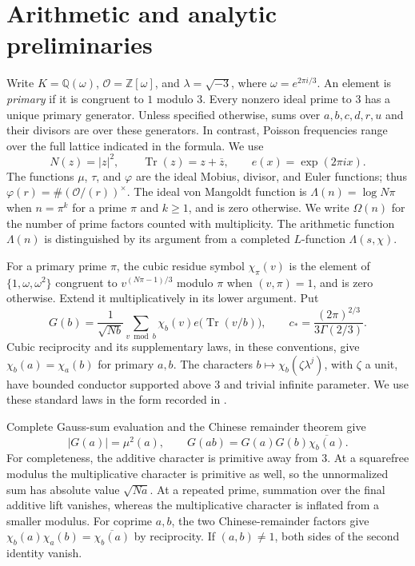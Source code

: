 \section{Arithmetic and analytic preliminaries}
\label{sec:background}
\label{sec:preliminaries}

Write $K=\mathbb Q(\omega)$, $\mathcal O=\mathbb Z[\omega]$, and
$\lambda=\sqrt{-3}$, where $\omega=e^{2\pi i/3}$.
An element is \emph{primary} if it is congruent to $1$ modulo $3$.
Every nonzero ideal prime to $3$ has a unique primary generator.
Unless specified otherwise, sums over $a,b,c,d,r,u$ and their divisors
are over these generators. In contrast, Poisson frequencies range over
the full lattice indicated in the formula. We use
\[
 N(z)=|z|^2,\qquad \operatorname{Tr}(z)=z+\overline z,
 \qquad e(x)=\exp(2\pi i x).
\]
The functions $\mu$, $\tau$, and $\varphi$ are the ideal Mobius, divisor,
and Euler functions; thus $\varphi(r)=\#(\mathcal O/(r))^\times$.
The ideal von Mangoldt function is $\Lambda(n)=\log N\pi$ when
$n=\pi^k$ for a prime $\pi$ and $k\ge1$, and is zero otherwise.
We write $\Omega(n)$ for the number of prime factors counted with
multiplicity. The arithmetic function $\Lambda(n)$ is distinguished
by its argument from a completed $L$-function $\Lambda(s,\chi)$.


For a primary prime $\pi$, the cubic residue symbol
$\chi_\pi(v)$ is the element of $\{1,\omega,\omega^2\}$ congruent to
$v^{(N\pi-1)/3}$ modulo $\pi$ when $(v,\pi)=1$, and is zero otherwise.
Extend it multiplicatively in its lower argument. Put
\[
 G(b)=\frac{1}{\sqrt{Nb}}\sum_{v\bmod b}
       \chi_b(v)e\bigl(\operatorname{Tr}(v/b)\bigr),
 \qquad c_* =\frac{(2\pi)^{2/3}}{3\Gamma(2/3)}.
\]
Cubic reciprocity and its supplementary laws, in these conventions,
give $\chi_b(a)=\chi_a(b)$ for primary $a,b$.
The characters $b\mapsto\chi_b(\zeta\lambda^j)$, with $\zeta$ a unit,
have bounded conductor supported above $3$ and trivial infinite
parameter. We use these standard laws in the form recorded in
\cite[Section 2]{DR2024}.

Complete Gauss-sum evaluation and the Chinese remainder theorem give
\begin{equation}
 |G(a)|=\mu^2(a),\qquad
 G(ab)=G(a)G(b)\overline{\chi_b(a)}.
 \label{eq:mult}
\end{equation}
For completeness, the additive character is primitive away from $3$.
At a squarefree modulus the multiplicative character is primitive as
well, so the unnormalized sum has absolute value $\sqrt{Na}$.
At a repeated prime, summation over the final additive lift vanishes,
whereas the multiplicative character is inflated from a smaller modulus.
For coprime $a,b$, the two Chinese-remainder factors give
$\chi_b(a)\chi_a(b)=\overline{\chi_b(a)}$ by reciprocity.
If $(a,b)\ne1$, both sides of the second identity vanish.


